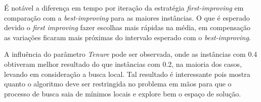 \documentclass[brazilian,12pt]{article}
\begin{document}
É notável a diferença em tempo por iteração da estratégia \textit{first-improving} em comparação com a \textit{best-improving} para as maiores instâncias. O que é esperado devido o \textit{first improving} fazer escolhas mais rápidas na média, em compensação as variações ficaram mais próximas do intervalo esperado com o \textit{best-improving}.

A influência do parâmetro \textit{Tenure} pode ser observada, onde as instâncias com 0.4 obtiveram melhor resultado do que instâncias com 0.2, na maioria dos casos, levando em consideração a busca local. Tal resultado é interessante pois mostra quanto o algoritmo deve ser restringida no problema em mãos para que o processo de busca saia de mínimos locais e explore bem o espaço de solução.



\end{document}
